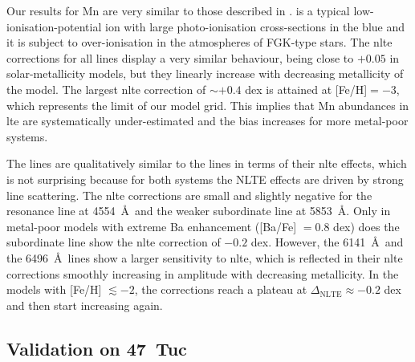 \documentclass{aa}
\begin{document}
Our results for Mn are very similar to those described in \citet{Eitner2020}.  is a typical low-ionisation-potential ion with large photo-ionisation cross-sections in the blue and it is subject to over-ionisation in the atmospheres of FGK-type stars. The \ac{nlte} corrections for all  lines display a very similar behaviour, being close to $+0.05$ in solar-metallicity models, but they linearly increase with decreasing metallicity of the model. The largest \ac{nlte} correction of $\sim +0.4$ dex is attained at [Fe/H]$=-3$, which represents the limit of our model grid. This implies that Mn abundances in \ac{lte} are systematically under-estimated and the bias increases for more metal-poor systems.

The  lines are qualitatively similar to the  lines in terms of their \ac{nlte} effects, which is not surprising because for both systems the NLTE effects are driven by strong line scattering. The \ac{nlte} corrections are small and slightly negative for the resonance line at 4554~\AA\ and the weaker subordinate line at 5853~\AA. Only in metal-poor models with extreme Ba enhancement ([Ba/Fe] $=0.8$ dex) does the subordinate line show the \ac{nlte} correction of $-0.2$ dex. However, the 6141~\AA\ and the 6496~\AA\ lines show a larger sensitivity to \ac{nlte}, which is reflected in their \ac{nlte} corrections smoothly increasing in amplitude with decreasing metallicity. In the models with [Fe/H] $\lesssim -2$, the corrections reach a plateau at $\Delta_\mathrm{NLTE} \approx -0.2$ dex and then start increasing again.


\subsection{Validation on 47~Tuc}
\label{sec:47tuc}
\end{document}
